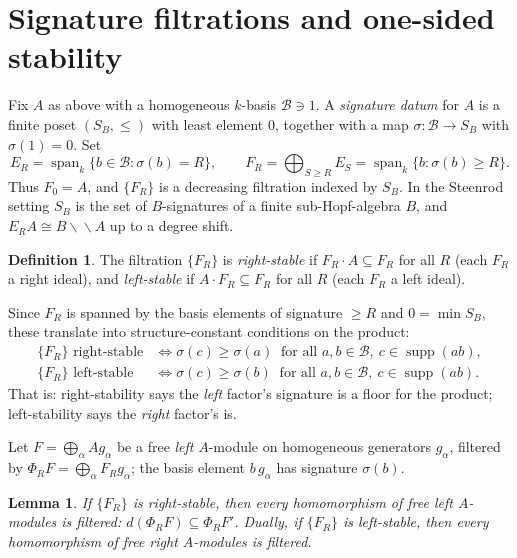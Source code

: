 \documentclass[11pt]{article}
\newtheorem{lemma}[theorem]{Lemma}
\theoremstyle{definition}
\newtheorem{definition}[theorem]{Definition}
\DeclareMathOperator{\supp}{supp}
\begin{document}
\section{Signature filtrations and one-sided stability}\label{sec:stability}

Fix $A$ as above with a homogeneous $k$-basis $\mathcal B\ni 1$. A \emph{signature
datum} for $A$ is a finite poset $(S_B,\le)$ with least element $0$, together with a
map $\sigma\colon\mathcal B\to S_B$ with $\sigma(1)=0$. Set
\[
  E_R=\operatorname{span}_k\{b\in\mathcal B:\sigma(b)=R\},\qquad
  F_R=\bigoplus_{S\ge R}E_S=\operatorname{span}_k\{b:\sigma(b)\ge R\}.
\]
Thus $F_0=A$, and $\{F_R\}$ is a decreasing filtration indexed by $S_B$. In the
Steenrod setting $S_B$ is the set of $B$-signatures of a finite sub-Hopf-algebra
$B$, and $E_RA\cong B\backslash\!\backslash A$ up to a degree shift.

\begin{definition}
The filtration $\{F_R\}$ is \emph{right-stable} if $F_R\cdot A\subseteq F_R$ for all
$R$ (each $F_R$ a right ideal), and \emph{left-stable} if $A\cdot F_R\subseteq F_R$
for all $R$ (each $F_R$ a left ideal).
\end{definition}

Since $F_R$ is spanned by the basis elements of signature $\ge R$ and $0=\min S_B$,
these translate into structure-constant conditions on the product:
\begin{align}
  \{F_R\}\text{ right-stable}
  &\iff \sigma(c)\ge\sigma(a)\ \text{ for all }a,b\in\mathcal B,\ c\in\supp(ab),
  \tag{L-floor}\label{eq:Lfloor}\\
  \{F_R\}\text{ left-stable}
  &\iff \sigma(c)\ge\sigma(b)\ \text{ for all }a,b\in\mathcal B,\ c\in\supp(ab).
  \tag{R-floor}\label{eq:Rfloor}
\end{align}
That is: right-stability says the \emph{left} factor's signature is a floor for the
product; left-stability says the \emph{right} factor's is.

Let $F=\bigoplus_\alpha A g_\alpha$ be a free \emph{left} $A$-module on homogeneous
generators $g_\alpha$, filtered by $\Phi_RF=\bigoplus_\alpha F_R g_\alpha$; the
basis element $b\,g_\alpha$ has signature $\sigma(b)$.

\begin{lemma}\label{lem:filtered}
If $\{F_R\}$ is right-stable, then every homomorphism of free left $A$-modules is
filtered: $d(\Phi_RF)\subseteq\Phi_RF'$. Dually, if $\{F_R\}$ is left-stable, then
every homomorphism of free \emph{right} $A$-modules is filtered.
\end{lemma}
\end{document}
